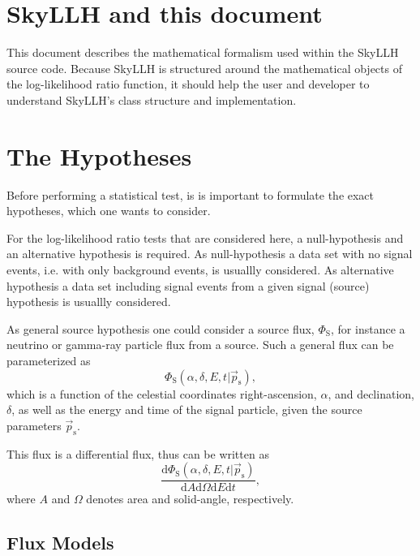 \documentclass{article}
\newcommand{\ps}{\vec{p}_{\mathrm{s}}}
\begin{document}
\section{SkyLLH and this document}

This document describes the mathematical formalism used within the SkyLLH
source code. Because SkyLLH is structured around the mathematical objects of the
log-likelihood ratio function, it should help the user and developer to
understand SkyLLH's class structure and implementation.

\section{The Hypotheses}

Before performing a statistical test, is is important to formulate the exact
hypotheses, which one wants to consider.

For the log-likelihood ratio tests that are considered here, a null-hypothesis
and an alternative hypothesis is required. As null-hypothesis a data set with
no signal events, i.e. with only background events, is usuallly considered.
As alternative hypothesis a data set including signal events from a given signal
(source) hypothesis is usuallly considered.

As general source hypothesis one could consider a source flux, $\Phi_{\mathrm{S}}$,
for instance a neutrino or gamma-ray particle flux from a source. Such a general flux
can be parameterized as
\begin{equation}
 \Phi_{\mathrm{S}}(\alpha,\delta,E,t|\ps),
 \label{eq:PhiS-general}
\end{equation}
which is a function of the celestial coordinates right-ascension, $\alpha$, and
declination, $\delta$, as well as the energy and time of the signal
particle, given the source parameters $\ps$.

This flux is a differential flux, thus can be written as
\begin{equation}
 \frac{\mathrm{d}\Phi_{\mathrm{S}}(\alpha,\delta,E,t|\ps)}{\mathrm{d}A\mathrm{d}\Omega\mathrm{d}E\mathrm{d}t},
 \label{eq:differential-PhiS-general}
\end{equation}
where $A$ and $\Omega$ denotes area and solid-angle, respectively.

\subsection{Flux Models}
\label{sec:flux-models}
\end{document}
